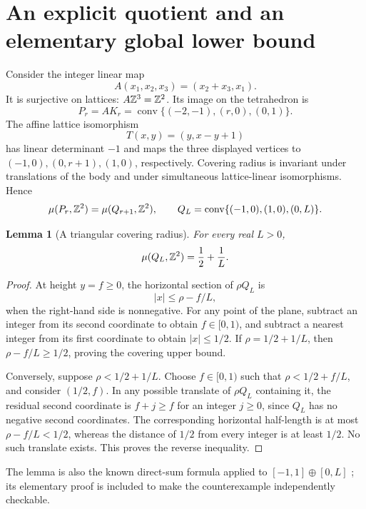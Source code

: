 \documentclass[11pt,a4paper]{article}
\newtheorem{lemma}[theorem]{Lemma}
\theoremstyle{remark}
\DeclareMathOperator{\conv}{conv}
\begin{document}
\section{An explicit quotient and an elementary global lower bound}
Consider the integer linear map
\begin{equation}\label{eq:A}
 A(x_1,x_2,x_3)=(x_2+x_3,x_1).
\end{equation}
It is surjective on lattices: $A\mathbb Z^3=\mathbb Z^2$. Its image on the
tetrahedron is
\begin{equation}\label{eq:Pr}
 P_r=AK_r=\conv\{(-2,-1),(r,0),(0,1)\}.
\end{equation}
The affine lattice isomorphism
\[
 T(x,y)=(y,x-y+1)
\]
has linear determinant $-1$ and maps the three displayed vertices to
$(-1,0),(0,r+1),(1,0)$, respectively. Covering radius is invariant
under translations of the body and under simultaneous lattice-linear
isomorphisms. Hence
\begin{equation}\label{eq:Qr}
 \mu(P_r,\Z^2)=\mu(Q_{r+1},\Z^2),\qquad
 Q_L=\conv\{(-1,0),(1,0),(0,L)\}.
\end{equation}

\begin{lemma}[A triangular covering radius]\label{lem:triangle}
For every real $L>0$,
\[
 \mu(Q_L,\mathbb Z^2)=\frac12+\frac1L.
\]
\end{lemma}
\begin{proof}
At height $y=f\ge0$, the horizontal section of $\rho Q_L$ is
\[
 |x|\le\rho-f/L,
\]
when the right-hand side is nonnegative. For any point of the plane,
subtract an integer from its second coordinate to obtain
$f\in[0,1)$, and subtract a nearest integer from its first coordinate
to obtain $|x|\le1/2$. If $\rho=1/2+1/L$, then
$\rho-f/L\ge1/2$, proving the covering upper bound.

Conversely, suppose $\rho<1/2+1/L$. Choose $f\in[0,1)$ such that
$\rho<1/2+f/L$, and consider $(1/2,f)$. In any possible translate of
$\rho Q_L$ containing it, the residual second coordinate is
$f+j\ge f$ for an integer $j\ge0$, since $Q_L$ has no negative
second coordinates. The corresponding horizontal half-length is at
most $\rho-f/L<1/2$, whereas the distance of $1/2$ from every integer
is at least $1/2$. No such translate exists. This proves the reverse
inequality.
\end{proof}

The lemma is also the known direct-sum formula applied to
$[-1,1]\oplus[0,L]$ \cite[Corollary 2.2]{CSS}; its elementary proof
is included to make the counterexample independently checkable.
\end{document}
